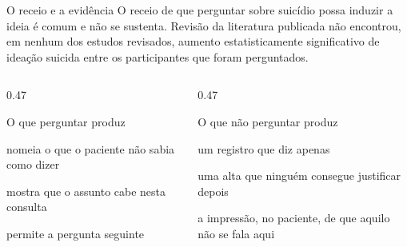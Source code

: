 
\begin{frame}{}
\begin{caixaavaliar}{O receio e a evid\^encia}
O receio de que perguntar sobre suic\'idio possa induzir a ideia \'e comum e
n\~ao se sustenta. Revis\~ao da literatura publicada n\~ao encontrou, em
nenhum dos estudos revisados, aumento estatisticamente significativo de
idea\c{c}\~ao suicida entre os participantes que foram perguntados.
\end{caixaavaliar}

\CRvg
\begin{columns}[onlytextwidth, t]
\begin{column}{0.47\textwidth}
\begin{caixaproteger}{O que perguntar produz}
\begin{itemc}
\item nomeia o que o paciente n\~ao sabia como dizer
\item mostra que o assunto cabe nesta consulta
\item permite a pergunta seguinte
\end{itemc}
\end{caixaproteger}
\end{column}
\calha
\begin{column}{0.47\textwidth}
\begin{caixaagir}{O que n\~ao perguntar produz}
\begin{itemc}
\item um registro que diz apenas 
\item uma alta que ningu\'em consegue justificar depois
\item a impress\~ao, no paciente, de que aquilo n\~ao se fala aqui
\end{itemc}
\end{caixaagir}
\end{column}
\end{columns}

\end{frame}

